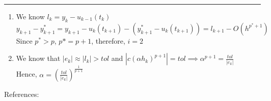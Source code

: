 \documentclass[11pt]{article}
\begin{document}





\begin{quote}

\end{quote}

\hrule

\begin{solution}
\item 

\begin{enumerate}
    \item  We know $l_k = y_k - u_{k-1}(t_k)$\\
    
    $y_{k+1} - y_{k+1}^* = y_{k+1} -  u_{k}(t_{k+1}) - (y_{k+1}^* - u_{k}(t_{k+1}))
    = l_{k+1}-O(h^{p^*+1})$\\
    Since $p^* > p$, $p* = p + 1$, therefore, $i = 2$
    \\
    \item We know that $|e_k| \approx |l_k| > tol$ and $|c(\alpha h_k)^{p+1}| = tol \implies \alpha^{p+1} = \frac{tol}{|e_k|}$\\
    Hence, $\alpha = (\frac{tol}{|e_k|})^{\frac{1}{p+1}}$
    
\end{enumerate}

\end{solution}
References: \\ 
\end{document}
